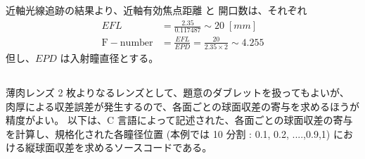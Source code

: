 \documentclass[a4paper,10pt]{jsarticle}
\begin{document}
\section{}

\subsection{}
近軸光線追跡の結果より、近軸有効焦点距離 と 開口数は、それぞれ
\begin{align*}
EFL &= \frac{2.35}{0.117487} \sim 20 \; [mm] \\
\mathrm{F-number} &= \frac{EFL}{EPD} = \frac{20}{2.35 \times 2} \sim 4.255
\end{align*}
但し、$EPD$ は入射瞳直径とする。

\subsection{}
薄肉レンズ 2 枚よりなるレンズとして、題意のダブレットを扱ってもよいが、
肉厚による収差誤差が発生するので、各面ごとの球面収差の寄与を求めるほうが精度がよい。
以下は、C 言語によって記述された、各面ごとの球面収差の寄与を計算し、規格化された各瞳径位置
(本例では 10 分割 : 0.1, 0.2, ....,0.9,1)
における縦球面収差を求めるソースコードである。
\end{document}
